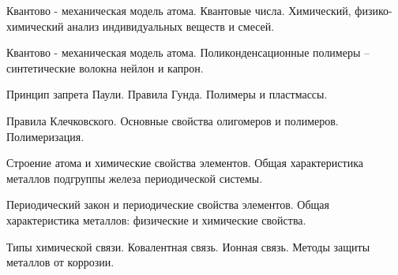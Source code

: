 \documentclass[
	14pt,
	a4paper,
	]
	{scrartcl}
\begin{document}
\shapk
{}
\setcounter{zad}{0}

\vfill
\z Квантово - механическая модель атома. Квантовые числа.
 \vfill
\z Химический, физико-химический анализ индивидуальных веществ и смесей. \vfill

\vfill

\newpage


\shapk
{}
\setcounter{zad}{0}

\vfill
\z Квантово - механическая модель атома.
 \vfill
\z Поликонденсационные полимеры – синтетические волокна нейлон и капрон.
 \vfill

\vfill

\newpage


\shapk
{}
\setcounter{zad}{0}

\vfill
\z Принцип запрета Паули. Правила Гунда.
 \vfill
\z Полимеры и пластмассы.
 \vfill

\vfill

\newpage


\shapk
{}
\setcounter{zad}{0}

\vfill
\z Правила Клечковского.
 \vfill
\z Основные свойства олигомеров и полимеров. Полимеризация.
 \vfill

\vfill

\newpage


\shapk
{}
\setcounter{zad}{0}

\vfill
\z Строение атома и химические свойства элементов.
 \vfill
\z Общая характеристика металлов подгруппы железа периодической системы.
 \vfill

\vfill

\newpage


\shapk
{}
\setcounter{zad}{0}

\vfill
\z Периодический закон и периодические свойства элементов.
 \vfill
\z Общая характеристика металлов: физические и химические свойства.
 \vfill

\vfill

\newpage


\shapk
{}
\setcounter{zad}{0}

\vfill
\z Типы химической связи. Ковалентная связь. Ионная связь.
 \vfill
\z Методы защиты металлов от коррозии.
 \vfill

\vfill

\newpage


\shapk
{}
\setcounter{zad}{0}
\end{document}

